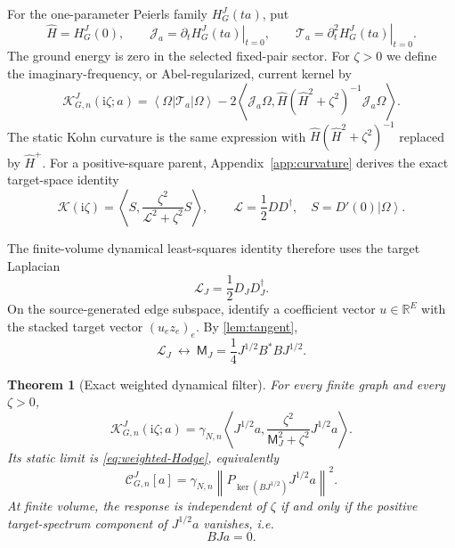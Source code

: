 \documentclass[11pt]{article}
\newtheorem{theorem}{Theorem}[section]
\theoremstyle{definition}
\theoremstyle{remark}
\newcommand{\ket}[1]{\left|#1\right\rangle}
\newcommand{\bra}[1]{\left\langle#1\right|}
\newcommand{\I}{\mathrm i}
\newcommand{\R}{\mathbb R}
\newcommand{\cL}{\mathcal L}
\newcommand{\cC}{\mathcal C}
\newcommand{\cK}{\mathcal K}
\newcommand{\ip}[2]{\left\langle #1,#2\right\rangle}
\newcommand{\norm}[1]{\left\lVert #1\right\rVert}
\begin{document}
For the one-parameter Peierls family $H_G^J(ta)$, put
\[
 \widehat H=H_G^J(0),\qquad
 \mathcal J_a=\left.\partial_tH_G^J(ta)\right|_{t=0},\qquad
 \mathcal T_a=\left.\partial_t^2H_G^J(ta)\right|_{t=0}.
\]
The ground energy is zero in the selected fixed-pair sector.  For $\zeta>0$ we define the imaginary-frequency, or Abel-regularized, current kernel by
\begin{equation}
 \boxed{
 \cK_{G,n}^J(\I\zeta;a)
 =\bra\Omega\mathcal T_a\ket\Omega
 -2\ip{\mathcal J_a\Omega}
 {\widehat H(\widehat H^2+\zeta^2)^{-1}\mathcal J_a\Omega}.}
 \label{eq:K-definition}
\end{equation}
The static Kohn curvature is the same expression with
$\widehat H(\widehat H^2+\zeta^2)^{-1}$ replaced by $\widehat H^+$.
For a positive-square parent, Appendix~\ref{app:curvature} derives the exact target-space identity
\begin{equation}
 \cK(\I\zeta)=\ip S{\frac{\zeta^2}{\cL^2+\zeta^2}S},
 \qquad \cL=\frac12DD^\dagger,\quad S=D'(0)\ket\Omega.
 \label{eq:positive-square-dynamic-general}
\end{equation}

The finite-volume dynamical least-squares identity therefore uses the target Laplacian
\begin{equation}
 \cL_J=\frac12D_JD_J^\dagger.
\end{equation}
On the source-generated edge subspace, identify a coefficient vector $u\in\R^E$ with the stacked target vector $(u_ez_e)_e$.  By \cref{lem:tangent},
\begin{equation}
 \cL_J\ \longleftrightarrow\ 
 \mathsf M_J=\frac14J^{1/2}B^*BJ^{1/2}.
 \label{eq:target-lap}
\end{equation}

\begin{theorem}[Exact weighted dynamical filter]
\label{thm:dynamic}
For every finite graph and every $\zeta>0$,
\begin{equation}
 \boxed{
 \cK_{G,n}^{J}(\I\zeta;a)
 =\gamma_{N,n}\ip{J^{1/2}a}
 {\frac{\zeta^2}{\mathsf M_J^2+\zeta^2}J^{1/2}a}.}
 \label{eq:dynamic-filter}
\end{equation}
Its static limit is \eqref{eq:weighted-Hodge}, equivalently
\begin{equation}
 \cC_{G,n}^{J}[a]
 =\gamma_{N,n}\norm{P_{\ker(BJ^{1/2})}J^{1/2}a}^2.
 \label{eq:static-target}
\end{equation}
At finite volume, the response is independent of $\zeta$ if and only if the positive target-spectrum component of $J^{1/2}a$ vanishes, i.e.
\begin{equation}
 \boxed{BJa=0.}
 \label{eq:weighted-source-kernel}
\end{equation}
\end{theorem}
\end{document}
